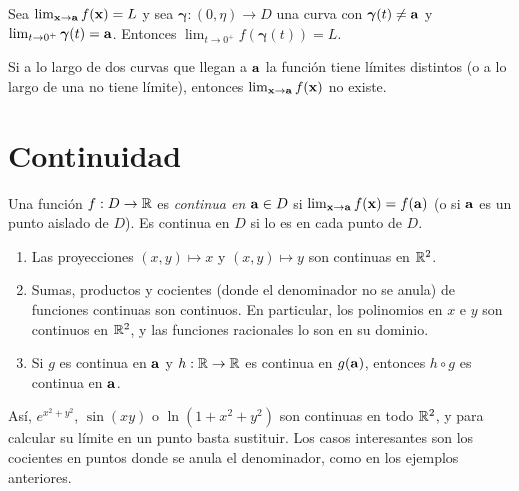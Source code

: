 \addtocounter{definicion}{1}%

\begin{teorema}\label{teo:trayectorias}
Sea $\lim_{\mathbf{x}\to\mathbf{a}}f(\mathbf{x})=L$ y sea $\boldsymbol\gamma:(0,\eta)\to D$ una curva con $\boldsymbol\gamma(t)\neq\mathbf{a}$ y $\lim_{t\to0^+}\boldsymbol\gamma(t)=\mathbf{a}$. Entonces $\lim_{t\to0^+}f(\boldsymbol\gamma(t))=L$.
\end{teorema}

\begin{corolario}\label{cor:no-existe}
Si a lo largo de dos curvas que llegan a $\mathbf{a}$ la función tiene límites distintos (o a lo largo de una no tiene límite), entonces $\lim_{\mathbf{x}\to\mathbf{a}}f(\mathbf{x})$ no existe.
\end{corolario}

\addtocounter{definicion}{1}%

\section{Continuidad}

\begin{definicion}[Continuidad]\label{def:continua-n}
Una función $f:D\to\mathbb{R}$ es \emph{continua en} $\mathbf{a}\in D$ si $\lim_{\mathbf{x}\to\mathbf{a}}f(\mathbf{x})=f(\mathbf{a})$ (o si $\mathbf{a}$ es un punto aislado de $D$). Es continua en $D$ si lo es en cada punto de $D$.
\end{definicion}

\begin{proposicion}\label{prop:continuas}
\begin{enumerate}
  \item Las proyecciones $(x,y)\mapsto x$ y $(x,y)\mapsto y$ son continuas en $\mathbb{R}^2$.
  \item Sumas, productos y cocientes (donde el denominador no se anula) de funciones continuas son continuos. En particular, los polinomios en $x$ e $y$ son continuos en $\mathbb{R}^2$, y las funciones racionales lo son en su dominio.
  \item Si $g$ es continua en $\mathbf{a}$ y $h:\mathbb{R}\to\mathbb{R}$ es continua en $g(\mathbf{a})$, entonces $h\circ g$ es continua en $\mathbf{a}$.
\end{enumerate}
\end{proposicion}

Así, $e^{x^2+y^2}$, $\sin(xy)$ o $\ln(1+x^2+y^2)$ son continuas en todo $\mathbb{R}^2$, y para calcular su límite en un punto basta sustituir. Los casos interesantes son los cocientes en puntos donde se anula el denominador, como en los ejemplos anteriores.

\addtocounter{definicion}{1}%

\addtocounter{definicion}{1}%

\addtocounter{definicion}{1}%

